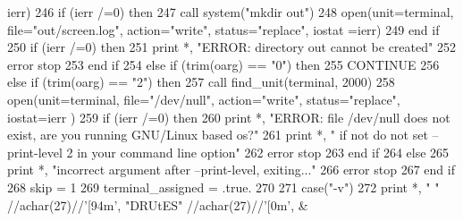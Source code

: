 \begin{DoxyCode}
{      ierr)}
246 \textcolor{comment}{                      }\textcolor{keywordflow}{if} (ierr /=0) \textcolor{keywordflow}{then}
247                         \textcolor{keyword}{call }system(\textcolor{stringliteral}{"mkdir out"})
248                         \textcolor{keyword}{open}(unit=terminal, file=\textcolor{stringliteral}{"out/screen.log"}, action=\textcolor{stringliteral}{"write"}, status=\textcolor{stringliteral}{"replace"}\textcolor{comment}{, iostat
      =ierr)}
249 \textcolor{comment}{}\textcolor{keywordflow}{                      end if}
250                       \textcolor{keywordflow}{if} (ierr /=0) \textcolor{keywordflow}{then}
251                         print *, \textcolor{stringliteral}{"ERROR: directory out cannot be created"}
252                         error stop
253 \textcolor{keywordflow}{                      end if}
254                     \textcolor{keywordflow}{else} \textcolor{keywordflow}{if} (trim(oarg) == \textcolor{stringliteral}{"0"}) \textcolor{keywordflow}{then}
255                       \textcolor{keywordflow}{CONTINUE}
256                     \textcolor{keywordflow}{else} \textcolor{keywordflow}{if} (trim(oarg) == \textcolor{stringliteral}{"2"}) \textcolor{keywordflow}{then}
257                         \textcolor{keyword}{call }find_unit(terminal, 2000)
258                         \textcolor{keyword}{open}(unit=terminal, file=\textcolor{stringliteral}{"/dev/null"}, action=\textcolor{stringliteral}{"write"}, status=\textcolor{stringliteral}{"replace"}\textcolor{comment}{, iostat=ierr
      )}
259 \textcolor{comment}{                        }\textcolor{keywordflow}{if} (ierr /=0) \textcolor{keywordflow}{then}
260                           print *, \textcolor{stringliteral}{"ERROR: file /dev/null does not exist, are you running GNU/Linux based
       os?"}
261                           print *, \textcolor{stringliteral}{"       if not do not set --print-level 2 in your command line option"}
262                           error stop
263 \textcolor{keywordflow}{                        end if}
264                       \textcolor{keywordflow}{else}
265                         print *, \textcolor{stringliteral}{"incorrect argument after --print-level, exiting..."}
266                         error stop
267 \textcolor{keywordflow}{                      end if}
268                     skip = 1
269                     terminal_assigned = .true.
270                                     
271             \textcolor{keywordflow}{case}(\textcolor{stringliteral}{"-v"})
272                 print *, \textcolor{stringliteral}{" "} //achar(27)//\textcolor{stringliteral}{'[94m'}, \textcolor{stringliteral}{"DRUtES"} //achar(27)//\textcolor{stringliteral}{'[0m'}, &

\end{DoxyCode}
